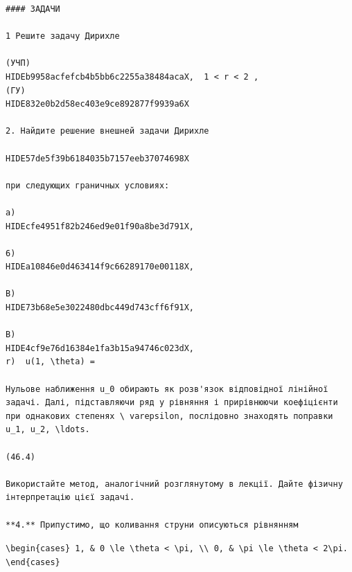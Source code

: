 \documentclass[
  ukrainian,
]{article}
\begin{document}
\begin{verbatim}
#### ЗАДАЧИ

1 Решите задачу Дирихле

(УЧП) 
HIDEb9958acfefcb4b5bb6c2255a38484acaX,  1 < r < 2 ,  
(ГУ) 
HIDE832e0b2d58ec403e9ce892877f9939a6X

2. Найдите решение внешней задачи Дирихле

HIDE57de5f39b6184035b7157eeb37074698X

при следующих граничных условиях:

a) 
HIDEcfe4951f82b246ed9e01f90a8be3d791X,

6) 
HIDEa10846e0d463414f9c66289170e00118X,

B) 
HIDE73b68e5e3022480dbc449d743cff6f91X,

B) 
HIDE4cf9e76d16384e1fa3b15a94746c023dX,  
r)  u(1, \theta) =

Нульове наближення u_0 обирають як розв'язок відповідної лінійної задачі. Далі, підставляючи ряд у рівняння і прирівнюючи коефіцієнти при однакових степенях \ varepsilon, послідовно знаходять поправки u_1, u_2, \ldots.

(46.4)

Використайте метод, аналогічний розглянутому в лекції. Дайте фізичну інтерпретацію цієї задачі.

**4.** Припустимо, що коливання струни описуються рівнянням
\end{verbatim}

\texttt{\textbackslash{}begin\{cases\}\ 1,\ \&\ 0\ \textbackslash{}le\ \textbackslash{}theta\ \textless{}\ \textbackslash{}pi,\ \textbackslash{}\textbackslash{}\ 0,\ \&\ \textbackslash{}pi\ \textbackslash{}le\ \textbackslash{}theta\ \textless{}\ 2\textbackslash{}pi.\ \textbackslash{}end\{cases\}}
\end{document}
